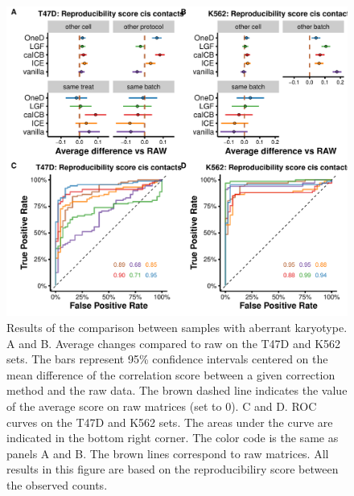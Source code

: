 \documentclass[12pt]{report}
\begin{document}
\begin{figure}
\centerline{\includegraphics[width=\textwidth]{img/correlation_aberrant_repro.pdf}}
\caption{
Results of the comparison between samples with aberrant karyotype. A and
B. Average changes compared to raw on the T47D and K562 sets. The bars
represent 95\% confidence intervals centered on the mean difference of the
correlation score between a given correction method and the raw data. The
brown dashed line indicates the value of the average score on raw matrices
(set to 0). C and D. ROC curves on the T47D and K562 sets. The areas under
the curve are indicated in the bottom right corner. The color code is the
same as panels A and B. The brown lines correspond to raw matrices. All
results in this figure are based on the reproducibiliry score between the
observed counts.}
\end{figure}
\end{document}
